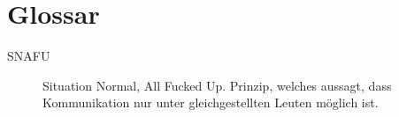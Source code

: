 \chapter{Glossar}

\begin{description}
  \item[SNAFU] Situation Normal, All Fucked Up. Prinzip, welches aussagt, dass
    Kommunikation nur unter gleichgestellten Leuten möglich ist.
\end{description}
